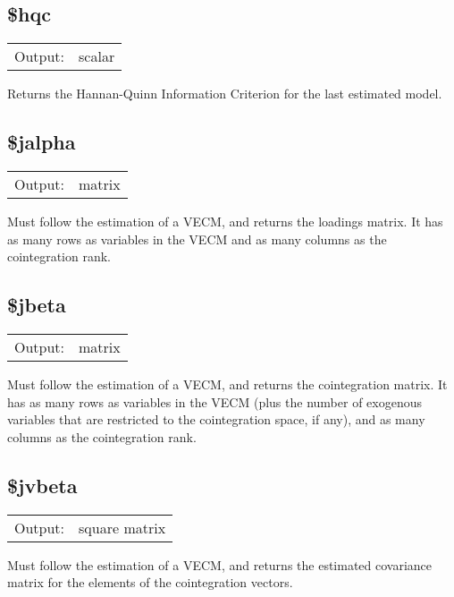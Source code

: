 \subsection{\$hqc}
\hypertarget{func-dolhqc}{}

\begin{tabular}{ll}
Output:     & scalar\\
\end{tabular}

	  Returns the Hannan-Quinn Information Criterion for the last
	  estimated model.

\subsection{\$jalpha}
\hypertarget{func-doljalpha}{}

\begin{tabular}{ll}
Output:     & matrix\\
\end{tabular}

	  Must follow the estimation of a VECM, and returns the loadings
	  matrix. It has as many rows as variables in the VECM and as many
	  columns as the cointegration rank.

\subsection{\$jbeta}
\hypertarget{func-doljbeta}{}

\begin{tabular}{ll}
Output:     & matrix\\
\end{tabular}

	  Must follow the estimation of a VECM, and returns the
	  cointegration matrix. It has as many rows as variables in the
	  VECM (plus the number of exogenous variables that are restricted
	  to the cointegration space, if any), and as many columns as the
	  cointegration rank.

\subsection{\$jvbeta}
\hypertarget{func-doljvbeta}{}

\begin{tabular}{ll}
Output:     & square matrix\\
\end{tabular}

	  Must follow the estimation of a VECM, and returns the estimated
	  covariance matrix for the elements of the cointegration vectors.

